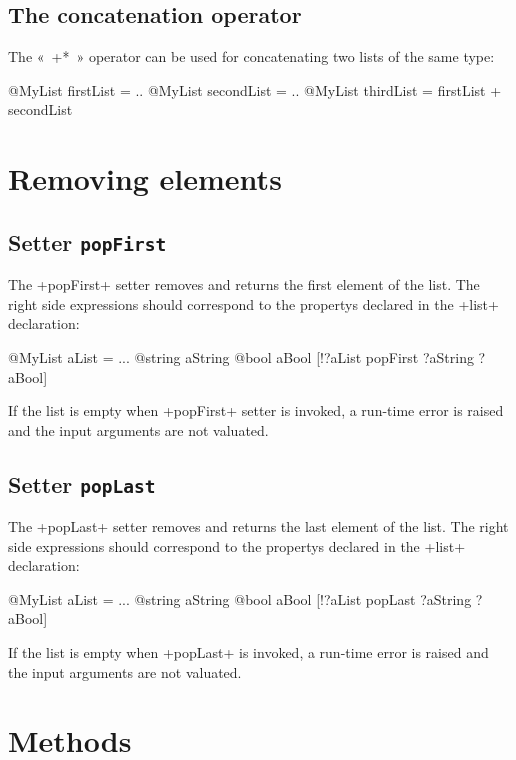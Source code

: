 \subsection{The concatenation operator}

The «~\ggs*+*~» operator can be used for concatenating two lists of the same type:


\begin{galgas}
@MyList firstList = ..
@MyList secondList = ..
@MyList thirdList = firstList + secondList
\end{galgas}

\section{Removing elements}

\subsection{Setter \texttt{popFirst}}


The \ggs+popFirst+ setter removes and returns the first element of the list. The right side expressions should correspond to the propertys declared in the \ggs+list+ declaration:

\begin{galgas}
@MyList aList = ...
@string aString
@bool aBool
[!?aList popFirst ?aString ?aBool]
\end{galgas}

If the list is empty when \ggs+popFirst+ setter is invoked, a run-time error is raised and the input arguments are not valuated.

\subsection{Setter \texttt{popLast}}


The \ggs+popLast+ setter removes and returns the last element of the list. The right side expressions should correspond to the propertys declared in the \ggs+list+ declaration:

\begin{galgas}
@MyList aList = ...
@string aString
@bool aBool
[!?aList popLast ?aString ?aBool]
\end{galgas}

If the list is empty when \ggs+popLast+ is invoked, a run-time error is raised and the input arguments are not valuated.

\section{Methods}

